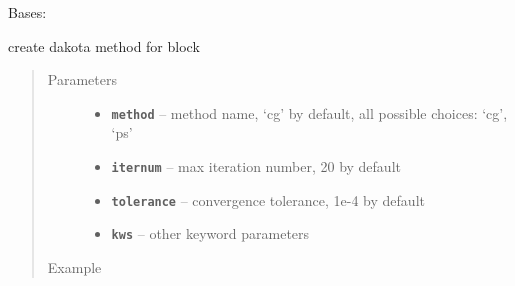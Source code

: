 \documentclass[letterpaper,10pt,english]{sphinxmanual}
\begin{document}
\begin{fulllineitems}
\label{src/apidocs/genopt:genopt.DakotaMethod}
Bases: \href{https://docs.python.org/2/library/functions.html\#object}{}

create dakota method for  block
\begin{quote}\begin{description}
\item[{Parameters}] \leavevmode\begin{itemize}
\item {} 
\textbf{\texttt{method}} -- method name, `cg' by default, all possible choices: `cg', `ps'

\item {} 
\textbf{\texttt{iternum}} -- max iteration number, 20 by default

\item {} 
\textbf{\texttt{tolerance}} -- convergence tolerance, 1e-4 by default

\item {} 
\textbf{\texttt{kws}} -- other keyword parameters

\end{itemize}

\item[{Example}] \leavevmode
\end{description}\end{quote}


\end{fulllineitems}
\end{document}
